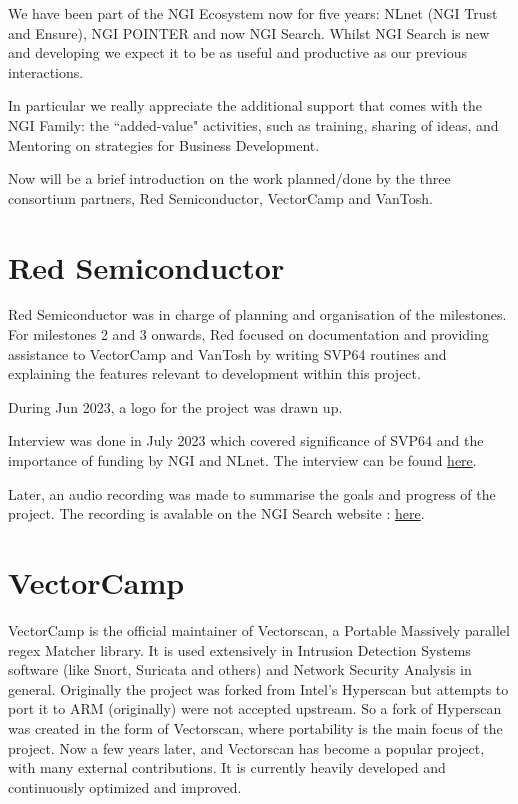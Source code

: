 We have been part of the \acrshort{NGI} Ecosystem now for five years:
NLnet (\acrshort{NGI} Trust and Ensure), \acrshort{NGI} POINTER and now \acrshort{NGI} Search.
Whilst \acrshort{NGI} Search is new and developing we expect it to be as
useful and productive as our previous interactions.

In particular we really appreciate the additional support that
comes with the \acrshort{NGI} Family: the ``added-value" activities, such
as training, sharing of ideas, and Mentoring on strategies for
Business Development.

Now will be a brief introduction on the work planned/done by the three
consortium partners, Red Semiconductor, VectorCamp and VanTosh.

\section{Red Semiconductor}

Red Semiconductor was in charge of planning and organisation of the milestones.
For milestones 2 and 3 onwards, Red focused on documentation and providing
assistance to VectorCamp and VanTosh by writing \acrshort{SVP64} routines and explaining
the features relevant to development within this project.

During Jun 2023, a logo for the project was drawn up.

Interview was done in July 2023 which covered significance of \acrshort{SVP64} and
the importance of funding by \acrshort{NGI} and NLnet.
The interview can be found
\href{https://spaces.fundingbox.com/spaces/ngi-community-ngi-innovators/64b8dadbabf7a659885ee01e}{here}.

Later, an audio recording was made to summarise the goals and progress of the
project. The recording is avalable on the NGI Search website :
\href{https://www.ngisearch.eu/view/Events/OC1Searchers}{here}.

\section{VectorCamp}

VectorCamp is the official maintainer of Vectorscan, a Portable Massively
parallel \acrfull{regex} Matcher library. It is used extensively in
Intrusion Detection Systems software (like Snort, Suricata and others)
and Network Security Analysis in general. Originally the project was forked
from Intel’s Hyperscan but attempts to port it to ARM (originally) were not
accepted upstream. So a fork of Hyperscan was created in the form of
Vectorscan, where portability is the main focus of the project.
Now a few years later, and Vectorscan has become a popular project,
with many external contributions. It is currently heavily developed and
continuously optimized and improved.

